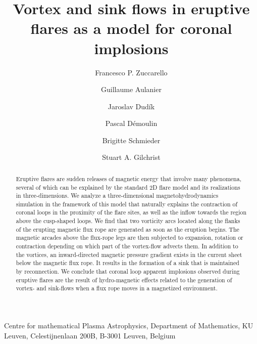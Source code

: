 \documentclass[apj]{emulateapj}
\newcommand{\pr}[1]{{\color{yellow}{#1}}}
\begin{document}
%
\title{Vortex and sink flows in eruptive flares as a model for coronal implosions }
%
\author{Francesco P. Zuccarello}
\author{Guillaume Aulanier}
\author{Jaroslav Dud\'ik}
\author{Pascal D\'{e}moulin}
\author{Brigitte Schmieder}
\author{Stuart A. Gilchrist}
%	


 {Centre for mathematical Plasma Astrophysics, Department of Mathematics, KU Leuven, Celestijnenlaan 200B, B-3001 Leuven, Belgium}


\begin{abstract}

Eruptive flares are sudden releases of magnetic energy that involve many phenomena, several of which can be explained by the standard 2D  flare model and its realizations in three-dimensions. 
We analyze a three-dimensional magnetohydrodynamics simulation in the framework of this model that naturally explains the  contraction of coronal loops in the proximity of the flare sites, as well as the inflow  towards the region above the cusp-shaped loops.  
%
We find that two vorticity arcs located along the flanks of the erupting magnetic flux rope are generated as soon as the eruption begins. The  magnetic arcades above the flux-rope legs are then subjected to expansion, rotation or contraction depending on which part of the vortex-flow advects them. In addition to the vortices, an inward-directed magnetic pressure gradient exists in the current sheet below the magnetic flux rope. It results in the formation of a sink that is maintained by reconnection. %
%
We conclude that coronal loop apparent implosions observed during eruptive flares are the result of hydro-magnetic effects related to the generation of vortex- and sink-flows when a flux rope  moves in a magnetized environment.  

\end{abstract}
\end{document}
